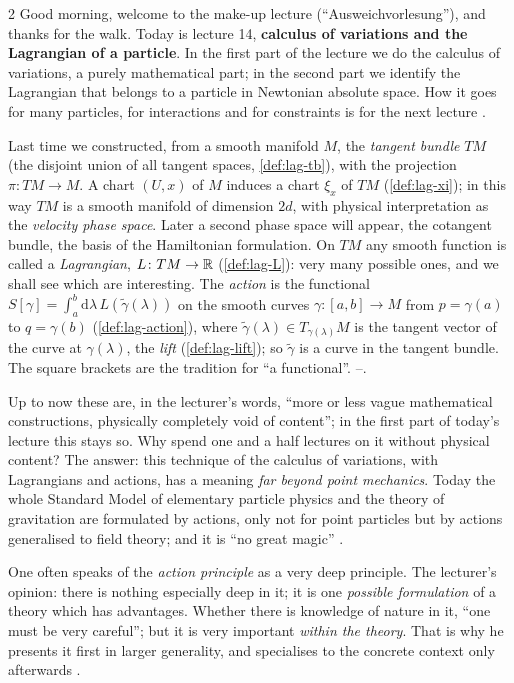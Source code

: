 \begin{paracol}{2}
Good morning, welcome to the make-up lecture (``Ausweichvorlesung''), and thanks for the walk. Today is lecture 14, \textbf{calculus of variations and the Lagrangian of a particle}. In the first part of the lecture we do the calculus of variations, a purely mathematical part; in the second part we identify the Lagrangian that belongs to a particle in Newtonian absolute space. How it goes for many particles, for interactions and for constraints is for the next lecture .

\begin{recall}\label{rec:var-last}
Last time we constructed, from a smooth manifold $M$, the \emph{tangent bundle} $TM$ (the disjoint union of all tangent spaces, \cref{def:lag-tb}), with the projection $\pi\colon TM\to M$. A chart $(U,x)$ of $M$ induces a chart $\xi_x$ of $TM$ (\cref{def:lag-xi}); in this way $TM$ is a smooth manifold of dimension $2d$, with physical interpretation as the \emph{velocity phase space}. Later a second phase space will appear, the cotangent bundle, the basis of the Hamiltonian formulation. On $TM$ any smooth function is called a \emph{Lagrangian}, $L\colon TM\to\mathbb{R}$ (\cref{def:lag-L}): very many possible ones, and we shall see which are interesting. The \emph{action} is the functional $S[\gamma]=\int_a^b\mathrm d\lambda\,L(\tilde\gamma(\lambda))$ on the smooth curves $\gamma\colon[a,b]\to M$ from $p=\gamma(a)$ to $q=\gamma(b)$ (\cref{def:lag-action}), where $\tilde\gamma(\lambda)\in T_{\gamma(\lambda)}M$ is the tangent vector of the curve at $\gamma(\lambda)$, the \emph{lift} (\cref{def:lag-lift}); so $\tilde\gamma$ is a curve in the tangent bundle. The square brackets are the tradition for ``a functional''.
--.
\end{recall}

Up to now these are, in the lecturer's words, ``more or less vague mathematical constructions, physically completely void of content''; in the first part of today's lecture this stays so. Why spend one and a half lectures on it without physical content? The answer: this technique of the calculus of variations, with Lagrangians and actions, has a meaning \emph{far beyond point mechanics}. Today the whole Standard Model of elementary particle physics and the theory of gravitation are formulated by actions, only not for point particles but by actions generalised to field theory; and it is ``no great magic'' .

\begin{aside}\label{as:var-principle}
One often speaks of the \emph{action principle} as a very deep principle. The lecturer's opinion: there is nothing especially deep in it; it is one \emph{possible formulation} of a theory which has advantages. Whether there is knowledge of nature in it, ``one must be very careful''; but it is very important \emph{within the theory}. That is why he presents it first in larger generality, and specialises to the concrete context only afterwards .
\end{aside}


\end{paracol}
